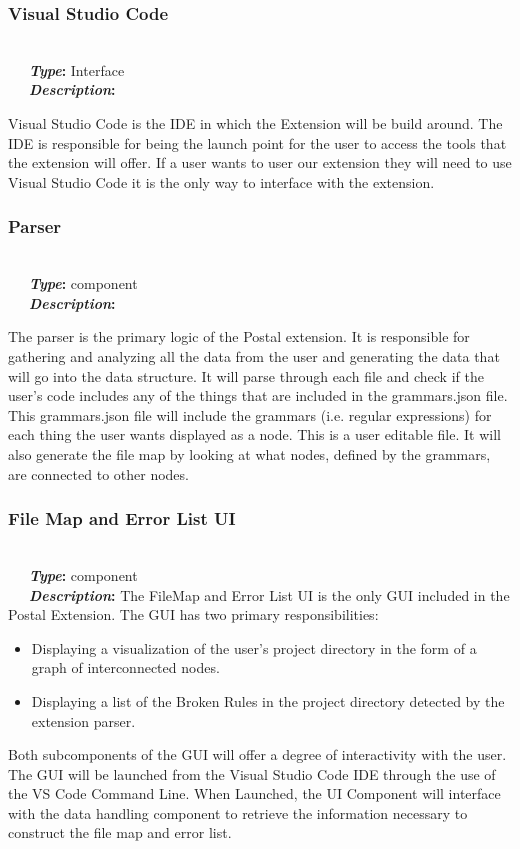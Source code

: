 \documentclass[letterpaper,10pt,titlepage,draftclsnofoot,onecolumn,onesided] {IEEEtran}
\newcommand{\bolditin}[2]{
	\-\ \-\ \-\ \textbf{\textit{#1}#2}
}
\begin{document}
\subsubsection{Visual Studio Code}
\hfill \\
\bolditin{Type}{:} Interface \\
\bolditin{Description}{:} 
Visual Studio Code is the IDE in which the Extension will be build around.
The IDE is responsible for being the launch point for the user to access the tools that the extension will offer.
If a user wants to user our extension they will need to use Visual Studio Code it is the only way to interface with the extension.

\subsubsection{Parser}
\hfill \\
\bolditin{Type}{:} component \\
\bolditin{Description}{:} 
The parser is the primary logic of the Postal extension. 
It is responsible for gathering and analyzing all the data from the user and generating the data that will go into the data structure.
It will parse through each file and check if the user's code includes any of the things that are included in the grammars.json file.
This grammars.json file will include the grammars (i.e. regular expressions) for each thing the user wants displayed as a node.
This is a user editable file.
It will also generate the file map by looking at what nodes, defined by the grammars, are connected to other nodes.
		
\subsubsection{File Map and Error List UI}
\hfill \\
\bolditin{Type}{:} component \\
\bolditin{Description}{:}  The FileMap and Error List UI is the only GUI included in the Postal Extension. 
The GUI has two primary responsibilities: 
\begin{itemize}
	\item Displaying a visualization of the user's project directory in the form of a graph of interconnected nodes.
	\item Displaying a list of the Broken Rules in the project directory detected by the extension parser.
\end{itemize}
Both subcomponents of the GUI will offer a degree of interactivity with the user. 
The GUI will be launched from the Visual Studio Code IDE through the use of the VS Code Command Line.
When Launched, the UI Component will interface with the data handling component to retrieve the information necessary to construct the file map and error list.
\end{document}
